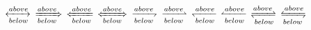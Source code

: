 \makeatletter
\newcommand*\acutelist{%
  \acute,\bar,\breve,\check,\dot,\ddot,\grave,%
  \hat,\widehat,\tilde,\widetilde,\vec,\mathring%
}
\newcommand*\acutekerning[1]{%
  \def\writetabline##1{%
    \edef\tabline{$##1$ & }%
    \def\@tempa####1{%
      \edef\tabline{%
        \tabline%
        $####1{##1}$ &  %
      }%
    }%
    \expandafter\forcsvlist\expandafter\@tempa\expandafter{\acutelist}%
    \edef\tabline{\tabline $##1^2$}%
    \tabline\tabularnewline%
  }%
  \begingroup%
    \clearpage%
    \noindent%
    \setlength\extrarowheight{4.2mm}%
    \newcolumntype{P}{>{\centering\arraybackslash}p{5.2mm}}%
    \begin{tabular}{*{16}P}%
      \forcsvlist{\writetabline}{#1}%
    \end{tabular}%
  \endgroup%
}
\newcommand*\testkerninguc{%
  \acutekerning{%
    A,B,C,D,E,F,G,H,I,J,K,L,M,N,O,P,Q,R,S,T,U,V,W,X,Y,Z
  }%
}
\newcommand*\testkerninglc{%
  \acutekerning{%
    a,b,c,d,e,f,g,h,i,\imath,j,\jmath,%
    k,l,m,n,o,p,q,r,s,t,u,v,w,x,y,z%
  }%
}
\newcommand*\testkerningucg{%
  \acutekerning{%
    \Gamma,\Delta,\Theta,\Lambda,\Xi,\Pi,%
    \Sigma,\Upsilon,\Phi,\Psi,\Omega,%
    \partial,\wp,\ell,\varepsilon,\vartheta,\varpi,\varrho,\varsigma,\varphi%
  }%
}
\newcommand*\testkerninglcg{%
  \acutekerning{%
    \alpha,\beta,\gamma,\delta,\epsilon,\zeta,\eta,%
    \theta,\iota,\kappa,\lambda,\mu,\nu,\xi,%
    \pi,\rho,\sigma,\tau,\upsilon,\phi,\chi,\psi,\omega%
  }%
}
\newcommand*\testkerningucgsl{%
  \acutekerning{%
    \varGamma,\varDelta,\varTheta,\varLambda,\varXi,\varPi,%
    \varSigma,\varUpsilon,\varPhi,\varPsi,\varOmega%
  }%
}
\newcommand*\testkerninglcgup{%
  \acutekerning{%
    \upalpha,\upbeta,\upgamma,\updelta,\upepsilon,\upzeta,\upeta,%
    \uptheta,\upiota,\upkappa,\uplambda,\upmu,\upnu,\upxi,\upomicron,%
    \uppi,\uprho,\upsigma,\uptau,\upupsilon,\upphi,\upchi,\upomega%
  }%
}
\newcommand*\testkerning[1]{%
  \csuse{testkerning#1}%
  \begingroup
    \clearpage
    \let\mv@normal\mv@nm%
    \let\mv@bold\mv@bm%
    \mathversion{normal}\selectfont%
    \csuse{testkerning#1}%
    \mathversion{bold}\selectfont%
    \csuse{testkerning#1}%
  \endgroup
}
\makeatother


%

%


$\xleftrightarrow[below]{above}$
$\xRightarrow[below]{above}$
$\xLeftarrow[below]{above}$
$\xLeftrightarrow[below]{above}$
$\xrightharpoondown[below]{above}$
$\xrightharpoonup[below]{above}$
$\xleftharpoondown[below]{above}$
$\xleftharpoonup[below]{above}$
$\xrightleftharpoons[below]{above}$
$\xleftrightharpoons[below]{above}$

